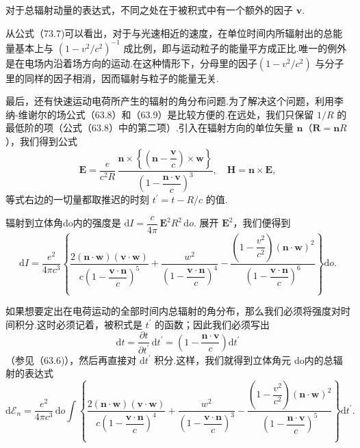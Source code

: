 对于总辐射动量的表达式，不同之处在于被积式中有一个额外的因子 $\boldsymbol{v}$.

从公式（73.7)可以看出，对于与光速相近的速度，在单位时间内所辐射出的总能量基本上与 $(1-v^2/c^2)^{-1}$ 成比例，即与运动粒子的能量平方成正比.唯一的例外是在电场内沿着场方向的运动.在这种情形下，分母里的因子$(1-v^2/c^2)$ 与分子里的同样的因子相消，因而辐射与粒子的能量无关.

最后，还有快速运动电荷所产生的辐射的角分布问题.为了解决这个问题，利用李纳-维谢尔的场公式（63.8）和（63.9）是比较方便的.在远处，我们只保留 $1/R$ 的最低阶的项（公式（63.8）中的第二项）.引入在辐射方向的单位矢量 $\boldsymbol{n}$（$\boldsymbol{R}=\boldsymbol{n}R$），我们得到公式
\begin{equation}
  \boldsymbol{E}=\frac{e}{c^2R}\,
  \frac{\boldsymbol{n}\times\left\{\left(\boldsymbol{n}-\dfrac{\boldsymbol{v}}{c}\right)\times\boldsymbol{w}\right\}}{\left(1-\dfrac{\boldsymbol{n}\cdot\boldsymbol{v}}{c}\right)^3},
  \quad
  \boldsymbol{H}=\boldsymbol{n}\times\boldsymbol{E},
\end{equation}
等式右边的一切量都取推迟的时刻 $t^{\prime}=t-R/c$ 的值.

辐射到立体角do内的强度是 $\mathrm{d}I=\dfrac{c}{4\pi}\,\boldsymbol{E}^2R^2\,\mathrm{d}o$. 展开 $\boldsymbol{E}^2$，我们便得到
\begin{equation}
  \mathrm{d}I=\frac{e^2}{4\pi c^3}\left\{
  \frac{2(\boldsymbol{n}\cdot\boldsymbol{w})(\boldsymbol{v}\cdot\boldsymbol{w})}{c\left(1-\dfrac{\boldsymbol{v}\cdot\boldsymbol{n}}{c}\right)^5}
  +\frac{w^2}{\left(1-\dfrac{\boldsymbol{v}\cdot\boldsymbol{n}}{c}\right)^4}
  -\frac{\left(1-\dfrac{v^2}{c^2}\right)(\boldsymbol{n}\cdot\boldsymbol{w})^2}{\left(1-\dfrac{\boldsymbol{v}\cdot\boldsymbol{n}}{c}\right)^6}\right\}\mathrm{d}o.
\end{equation}

如果想要定出在电荷运动的全部时间内总辐射的角分布，那么我们必须将强度对时间积分.这时必须记着，被积式是 $t^{\prime}$ 的函数；因此我们必须写出
\begin{equation}
  \mathrm{d}t=\frac{\partial t}{\partial t^{\prime}}\,\mathrm{d}t^{\prime}
  =\left(1-\frac{\boldsymbol{n}\cdot\boldsymbol{v}}{c}\right)\mathrm{d}t^{\prime}
\end{equation}
（参见（63.6)），然后再直接对 $\mathrm{d}t^{\prime}$ 积分.这样，我们就得到立体角元 do内的总辐射的表达式
\begin{equation}
  \mathrm{d}\mathcal{E}_n=\frac{e^2}{4\pi c^3}\,\mathrm{d}o\int\left\{
  \frac{2(\boldsymbol{n}\cdot\boldsymbol{w})(\boldsymbol{v}\cdot\boldsymbol{w})}{c\left(1-\dfrac{\boldsymbol{v}\cdot\boldsymbol{n}}{c}\right)^4}
  +\frac{w^2}{\left(1-\dfrac{\boldsymbol{v}\cdot\boldsymbol{n}}{c}\right)^3}
  -\frac{\left(1-\dfrac{v^2}{c^2}\right)(\boldsymbol{n}\cdot\boldsymbol{w})^2}{\left(1-\dfrac{\boldsymbol{n}\cdot\boldsymbol{v}}{c}\right)^5}\right\}\mathrm{d}t^{\prime}.
\end{equation}

